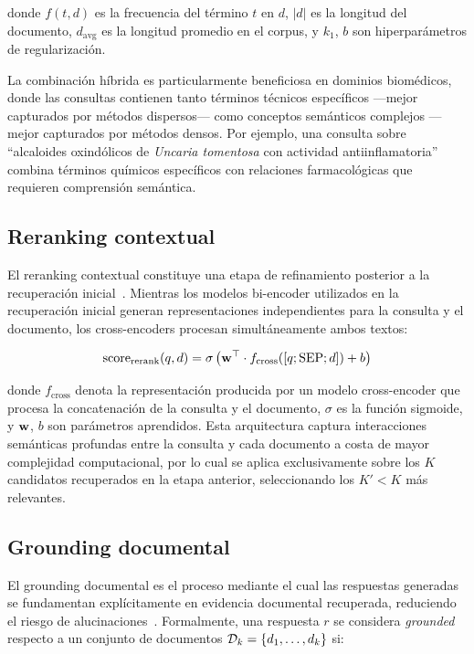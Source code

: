 \noindent donde $f(t, d)$ es la frecuencia del término $t$ en $d$, $|d|$ es la longitud del documento, $d_{\text{avg}}$ es la longitud promedio en el corpus, y $k_1$, $b$ son hiperparámetros de regularización.

La combinación híbrida es particularmente beneficiosa en dominios biomédicos, donde las consultas contienen tanto términos técnicos específicos —mejor capturados por métodos dispersos— como conceptos semánticos complejos —mejor capturados por métodos densos. Por ejemplo, una consulta sobre ``alcaloides oxindólicos de \textit{Uncaria tomentosa} con actividad antiinflamatoria'' combina términos químicos específicos con relaciones farmacológicas que requieren comprensión semántica.

\subsection{Reranking contextual}
\label{subsec:tf_reranking}

El reranking contextual constituye una etapa de refinamiento posterior a la recuperación inicial~\cite{nogueira2019passage}. Mientras los modelos bi-encoder utilizados en la recuperación inicial generan representaciones independientes para la consulta y el documento, los cross-encoders procesan simultáneamente ambos textos:

\begin{equation}
\label{eq:reranking}
  \operatorname{score}_{\text{rerank}}(q, d) = \sigma\left(\mathbf{w}^\top \cdot f_{\text{cross}}([q; \text{SEP}; d]) + b\right)
\end{equation}

\noindent donde $f_{\text{cross}}$ denota la representación producida por un modelo cross-encoder que procesa la concatenación de la consulta y el documento, $\sigma$ es la función sigmoide, y $\mathbf{w}$, $b$ son parámetros aprendidos. Esta arquitectura captura interacciones semánticas profundas entre la consulta y cada documento a costa de mayor complejidad computacional, por lo cual se aplica exclusivamente sobre los $K$ candidatos recuperados en la etapa anterior, seleccionando los $K' < K$ más relevantes.

\subsection{Grounding documental}
\label{subsec:tf_grounding}

El grounding documental es el proceso mediante el cual las respuestas generadas se fundamentan explícitamente en evidencia documental recuperada, reduciendo el riesgo de alucinaciones~\cite{ji2023survey}. Formalmente, una respuesta $r$ se considera \textit{grounded} respecto a un conjunto de documentos $\mathcal{D}_k = \{d_1, \ldots, d_k\}$ si:


